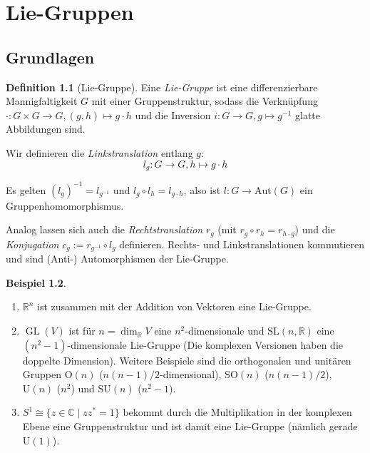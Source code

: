 \documentclass[a4paper]{scrreprt}
\numberwithin{equation}{chapter}
\DeclareMathOperator{\GL}{GL}
\newcommand{\R}{\mathbb{R}}
\theoremstyle{definition}
\newtheorem{defn}{Definition}[section]
\newtheorem{bsp}[defn]{Beispiel}
\begin{document}
\chapter{Lie-Gruppen}
	\section{Grundlagen}
		\begin{defn}[Lie-Gruppe]
			Eine \emph{Lie-Gruppe} ist eine differenzierbare Mannigfaltigkeit $G$ mit einer Gruppenstruktur, sodass die Verknüpfung $\cdot\colon G\times G\rightarrow G, (g,h)\mapsto g\cdot h$ und die Inversion ${i\colon G\rightarrow G}, {g\mapsto g^{-1}}$ glatte Abbildungen sind.
			
			Wir definieren die \emph{Linkstranslation} entlang $g$:
			\begin{equation}
				l_g\colon G\to G, h\mapsto g\cdot h
			\end{equation}
			
			Es gelten $(l_g)^{-1}=l_{g^{-1}}$ und $l_g\circ l_h=l_{g\cdot h}$, also ist $l\colon G\rightarrow \mathrm{Aut}(G)$ ein Gruppenhomomorphismus.
			
			Analog lassen sich auch die \emph{Rechtstranslation} $r_g$ (mit $r_g\circ r_h=r_{h\cdot g}$) und die \emph{Konjugation} $c_g:= r_{g^{-1}}\circ l_g$ definieren. Rechts- und Linkstranslationen kommutieren und sind (Anti-) Automorphismen der Lie-Gruppe.
		\end{defn}
		\begin{bsp}\hfill
			\begin{enumerate}
				\item $\R^n$ ist zusammen mit der Addition von Vektoren eine Lie-Gruppe.
				\item $\GL(V)$ ist für $n=\dim_{\R} V$ eine $n^2$-dimensionale und $\mathrm{SL}(n,\R)$ eine $(n^2-1)$-dimensionale Lie-Gruppe (Die komplexen Versionen haben die doppelte Dimension). Weitere Beispiele sind die orthogonalen und unitären Gruppen $\mathrm{O}(n)$ ($n(n-1)/2$-dimensional), $\mathrm{SO}(n)$ ($n(n-1)/2$), $\mathrm{U}(n)$ ($n^2$) und $\mathrm{SU}(n)$ ($n^2-1$).
				\item $S^1\cong \lbrace z\in \mathbb{C}\mid zz^*=1\rbrace$ bekommt durch die Multiplikation in der komplexen Ebene eine Gruppenstruktur und ist damit eine Lie-Gruppe (nämlich gerade $\mathrm{U}(1)$). 
			\end{enumerate}
			
		\end{bsp}
\end{document}
